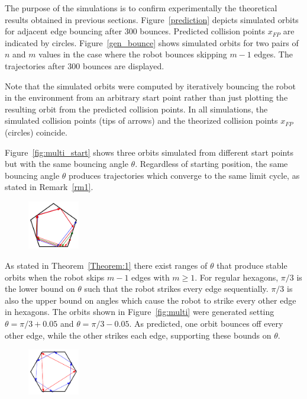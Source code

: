 \documentclass[letterpaper, 10 pt, conference]{ieeeconf}  %
\begin{document}
The purpose of the simulations is to confirm experimentally
the theoretical results obtained in previous sections. Figure~\ref{prediction} 
depicts simulated orbits for adjacent edge bouncing after 300 bounces. 
Predicted collision points $x_{FP}$ are indicated by circles. Figure~\ref{gen_bounce}
shows simulated orbits for two pairs of $n$ and $m$ values in the case where the
robot bounces skipping $m-1$ edges. The trajectories after 300 bounces are displayed.

Note that the simulated orbits were computed by iteratively bouncing
the robot in the environment from an arbitrary start point rather than just
plotting the resulting orbit from the predicted collision points.
In all simulations, the simulated collision points (tips of arrows) and the
theorized collision points $x_{FP}$ (circles) coincide.

Figure~\ref{fig:multi_start} shows three orbits simulated from different 
start points but with the same bouncing angle $\theta$. Regardless of starting
position, the same bouncing angle $\theta$ produces trajectories which
converge to the same limit cycle, as stated in 
Remark~\ref{rm1}.

\begin{figure}[bh]
\centering
\includegraphics[width=0.2\textwidth]{figs/multi_start.pdf}
\end{figure}

As stated in Theorem~\ref{Theorem:1} there exist ranges of $\theta$ that 
produce stable orbits when the robot skips $m-1$ edges with $m \geq 1$. For
regular hexagons, $\pi/3$ is the lower bound on $\theta$ such that the
robot strikes every edge sequentially. $\pi/3$ is also the upper bound on angles which
cause the robot to strike every other edge in hexagons. The orbits shown in Figure~\ref{fig:multi} were generated setting
$\theta = \pi/3 + 0.05$ and $\theta = \pi/3 - 0.05$. As predicted, one orbit
bounces off every other edge, while the other strikes each edge, supporting these
bounds on $\theta$.

\begin{figure}[bh]
\centering
\includegraphics[width=0.2\textwidth]{figs/multi.pdf}
\end{figure}
\end{document}
